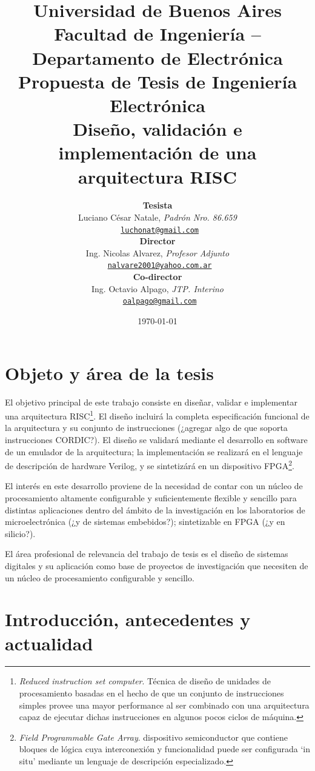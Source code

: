 \documentclass[a4paper]{article}
\title{
	{\normalsize
		Universidad de Buenos Aires\\
		Facultad de Ingeniería -- Departamento de Electrónica\\
		Propuesta de Tesis de Ingeniería Electrónica\\
		\vspace{0.7cm}
	}
	Diseño, validación e implementación de una arquitectura RISC
}
\author{	\textbf{Tesista}															\\
			Luciano César Natale, \textit{Padrón Nro. 86.659}               			\\
            \texttt{ \href{mailto:luchonat@gmail.com}{luchonat@gmail.com}}			\\[2.5ex]
            \textbf{Director}																\\
            Ing. Nicolas Alvarez, \textit{Profesor Adjunto}             				\\
            \texttt{ \href{mailto:nalvare2001@yahoo.com.ar}{nalvare2001@yahoo.com.ar}}  \\[2.5ex]
            \textbf{Co-director}															\\
            Ing. Octavio Alpago, \textit{JTP. Interino}               					\\
            \texttt{ \href{mailto:oalpago@gmail.com}{oalpago@gmail.com}}                \\[2.5ex]
       }
\date{\today}
\begin{document}
\maketitle



\thispagestyle{fancy}

\section{Objeto y área de la tesis}

El objetivo principal de este trabajo consiste en diseñar, validar e implementar una arquitectura RISC\footnote{\label{RISC} \emph{Reduced instruction set computer}. Técnica de diseño de unidades de procesamiento basadas en el hecho de que un conjunto de instrucciones simples provee una mayor performance al ser combinado con una arquitectura capaz de ejecutar dichas instrucciones en algunos pocos ciclos de máquina.}. El diseño incluirá la completa especificación funcional de la arquitectura y su conjunto de instrucciones (¿agregar algo de que soporta instrucciones CORDIC?). El diseño se validará mediante el desarrollo en software de un emulador de la arquitectura; la implementación se realizará en el lenguaje de descripción de hardware Verilog, y se sintetizárá en un dispositivo FPGA\footnote{\label{FPGA} \emph{Field Programmable Gate Array}. dispositivo semiconductor que contiene bloques de lógica cuya interconexión y funcionalidad puede ser configurada `in situ' mediante un lenguaje de descripción especializado.}.

El interés en este desarrollo proviene de la necesidad de contar con un núcleo de procesamiento altamente configurable y suficientemente flexible y sencillo para distintas aplicaciones dentro del ámbito de la investigación en los laboratorios de microelectrónica (¿y de sistemas embebidos?); sintetizable en FPGA
(¿y en silicio?).

El área profesional de relevancia del trabajo de tesis es el diseño de sistemas digitales y su aplicación como base de proyectos de investigación que necesiten de un núcleo de procesamiento configurable y sencillo.

\newpage

\section{Introducción, antecedentes y actualidad}
\end{document}
